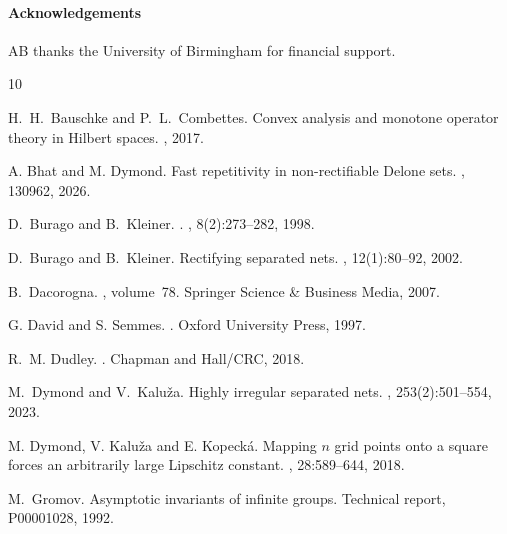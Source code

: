 \documentclass{article}
\begin{document}
    \paragraph{Acknowledgements}
    AB thanks the University of Birmingham for financial support. 

\newpage
\begin{thebibliography}{10}

H.~H.~Bauschke and P.~L.~Combettes.
\newblock Convex analysis and monotone operator theory in Hilbert spaces.
, 2017.

A. Bhat and M. Dymond.
\newblock Fast repetitivity in non-rectifiable {D}elone sets.
, 130962, 2026.

D.~Burago and B.~Kleiner.
.
, 8(2):273--282, 1998.

D.~Burago and B.~Kleiner.
\newblock Rectifying separated nets.
, 12(1):80--92, 2002.

B.~Dacorogna.
, volume~78.
\newblock Springer Science \& Business Media, 2007.

G. David and S. Semmes.
.
\newblock Oxford University Press, 1997.

R.~M. Dudley.
.
\newblock Chapman and Hall/CRC, 2018.

M.~Dymond and V.~Kalu{\v{z}}a.
\newblock Highly irregular separated nets.
, 253(2):501--554, 2023.

M. Dymond, V. Kalu{\v{z}}a and E. Kopeck{\'a}.
\newblock Mapping {$n$} grid points onto a square forces an arbitrarily large {L}ipschitz constant.
, 28:589--644, 2018.

M.~Gromov.
\newblock Asymptotic invariants of infinite groups.
\newblock Technical report, P00001028, 1992.


\end{thebibliography}
\end{document}
